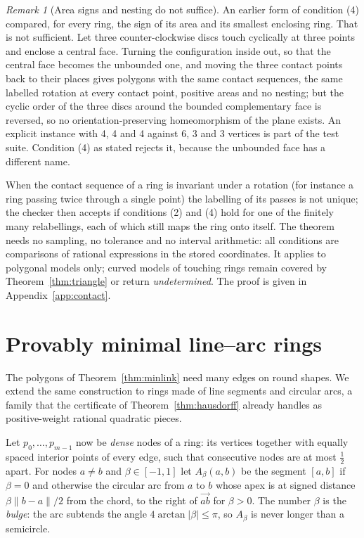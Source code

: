 \documentclass[11pt,a4paper]{article}
\theoremstyle{definition}
\theoremstyle{remark}
\newtheorem{remark}[theorem]{Remark}
\newcommand{\seg}[2]{[#1,#2]}
\begin{document}
\begin{remark}[Area signs and nesting do not suffice]\label{rem:necklace}
An earlier form of condition (4) compared, for every ring, the sign of its
area and its smallest enclosing ring. That is not sufficient. Let three
counter-clockwise discs touch cyclically at three points and enclose a
central face. Turning the configuration inside out, so that the central face
becomes the unbounded one, and moving the three contact points back to their
places gives polygons with the same contact sequences, the same labelled
rotation at every contact point, positive areas and no nesting; but the
cyclic order of the three discs around the bounded complementary face is
reversed, so no orientation-preserving homeomorphism of the plane exists. An
explicit instance with 4, 4 and 4 against 6, 3 and 3 vertices is part of the
test suite. Condition (4) as stated rejects it, because the unbounded face has
a different name.
\end{remark}

When the contact sequence of a ring is invariant under a rotation (for
instance a ring passing twice through a single point) the labelling of its
passes is not unique; the checker then accepts if conditions (2) and (4) hold
for one of the finitely many relabellings, each of which still maps the ring
onto itself. The theorem needs no sampling, no tolerance and no interval
arithmetic: all conditions are comparisons of rational expressions in the
stored coordinates. It applies to polygonal models only; curved models of
touching rings remain covered by Theorem~\ref{thm:triangle} or return
\emph{undetermined}. The proof is given in Appendix~\ref{app:contact}.

\section{Provably minimal line--arc rings}\label{sec:arcs}

The polygons of Theorem~\ref{thm:minlink} need many edges on round shapes. We
extend the same construction to rings made of line segments and circular arcs,
a family that the certificate of Theorem~\ref{thm:hausdorff} already handles as
positive-weight rational quadratic pieces.

Let $p_0,\dots,p_{m-1}$ now be \emph{dense} nodes of a ring: its vertices
together with equally spaced interior points of every edge, such that
consecutive nodes are at most $\tfrac12$ apart. For nodes $a\ne b$ and
$\beta\in[-1,1]$ let $A_\beta(a,b)$ be the segment $\seg ab$ if $\beta=0$ and
otherwise the circular arc from $a$ to $b$ whose apex is at signed distance
$\beta\lVert b-a\rVert/2$ from the chord, to the right of $\overrightarrow{ab}$
for $\beta>0$. The number $\beta$ is the \emph{bulge}: the arc subtends the
angle $4\arctan\lvert\beta\rvert\le\pi$, so $A_\beta$ is never longer than a
semicircle.
\end{document}
